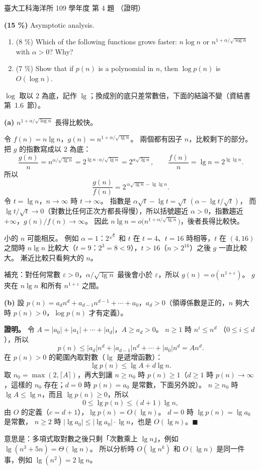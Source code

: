 \begin{pastexam}[label={px:ntu-109-esoe-ds-04}]{臺大工科海洋所 109 學年度 第 4 題}
（證明）

\textbf{(15 \%)} Asymptotic analysis.
\begin{enumerate}[label=(\alph*)]
\item (8 \%) Which of the following functions grows faster: $n\log n$ or
$n^{1+\alpha/\sqrt{\log n}}$ with $\alpha>0$? Why?
\item (7 \%) Show that if $p(n)$ is a polynomial in $n$, then $\log p(n)$ is $O(\log n)$.
\end{enumerate}
\end{pastexam}

\begin{pastsoln}
$\log$ 取以 $2$ 為底，記作 $\lg$；換成別的底只差常數倍，下面的結論不變（資結書第~1.6~節）。

\textbf{(a)} $n^{1+\alpha/\sqrt{\log n}}$ 長得比較快。

令 $f(n) = n \lg n$，$g(n) = n^{1 + \alpha/\sqrt{\lg n}}$。 兩個都有因子 $n$，比較剩下的部分。 把
$g$ 的指數寫成以 $2$ 為底：
\[
\frac{g(n)}{n} = n^{\alpha/\sqrt{\lg n}} = 2^{\lg n \cdot \alpha/\sqrt{\lg n}} = 2^{\alpha\sqrt{\lg n}},
\qquad
\frac{f(n)}{n} = \lg n = 2^{\lg\lg n}.
\]
所以
\[
\frac{g(n)}{f(n)} = 2^{\,\alpha\sqrt{\lg n} - \lg\lg n}.
\]
令 $t = \lg n$，$n \to \infty$ 時 $t \to \infty$。 指數是 $\alpha\sqrt{t} - \lg t = \sqrt{t}\,(\alpha - \lg t/\sqrt{t})$，
而 $\lg t / \sqrt{t} \to 0$（對數比任何正次方都長得慢），所以括號趨近 $\alpha > 0$，指數趨近
$+\infty$，$g(n)/f(n) \to \infty$。 因此 $n\lg n = o\bigl(n^{1+\alpha/\sqrt{\lg n}}\bigr)$，後者長得比較快。

小的 $n$ 可能相反。 例如 $\alpha = 1$：$2^{\sqrt{t}}$ 和 $t$ 在 $t = 4$、$t = 16$ 時相等，$t$ 在
$(4, 16)$ 之間時 $n\lg n$ 比較大（$t = 9$：$2^3 = 8 < 9$），$t > 16$（$n > 2^{16}$）之後 $g$ 一直比較
大。 漸近比較只看夠大的 $n$。

補充：對任何常數 $\varepsilon > 0$，$\alpha/\sqrt{\lg n}$ 最後會小於 $\varepsilon$，所以
$g(n) = o(n^{1+\varepsilon})$。 $g$ 夾在 $n\lg n$ 和所有 $n^{1+\varepsilon}$ 之間。

\textbf{(b)} 設 $p(n) = a_d n^d + a_{d-1} n^{d-1} + \cdots + a_0$，$a_d > 0$（領導係數是正的，$n$ 夠大
時 $p(n) > 0$，$\log p(n)$ 才有定義）。

\textbf{證明。} 令 $A = |a_0| + |a_1| + \cdots + |a_d|$，$A \ge a_d > 0$。 $n \ge 1$ 時 $n^i \le n^d$
（$0 \le i \le d$），所以
\[
p(n) \le |a_d| n^d + |a_{d-1}| n^d + \cdots + |a_0| n^d = A n^d .
\]
在 $p(n) > 0$ 的範圍內取對數（$\lg$ 是遞增函數）：
\[
\lg p(n) \le \lg A + d \lg n .
\]
取 $n_0 = \max(2, \lceil A\rceil)$，再大到讓 $n \ge n_0$ 時 $p(n) \ge 1$（$d \ge 1$ 時
$p(n) \to \infty$，這樣的 $n_0$ 存在；$d = 0$ 時 $p(n) = a_0$ 是常數，下面另外說）。 $n \ge n_0$ 時
$\lg A \le \lg n$，而且 $\lg p(n) \ge 0$，所以
\[
0 \le \lg p(n) \le (d + 1)\lg n ,
\]
由 $O$ 的定義（$c = d + 1$），$\lg p(n) = O(\lg n)$。 $d = 0$ 時 $\lg p(n) = \lg a_0$ 是常數，
$n \ge 2$ 時 $|\lg a_0| \le |\lg a_0| \cdot \lg n$，也是 $O(\lg n)$。\hfill$\blacksquare$

意思是：多項式取對數之後只剩「次數乘上 $\lg n$」，例如 $\lg(n^3 + 5n) = \Theta(\lg n)$。 所以分析時
$O(\lg n^k)$ 和 $O(\lg n)$ 是同一件事，例如 $\lg (n^2) = 2\lg n$。
\end{pastsoln}
